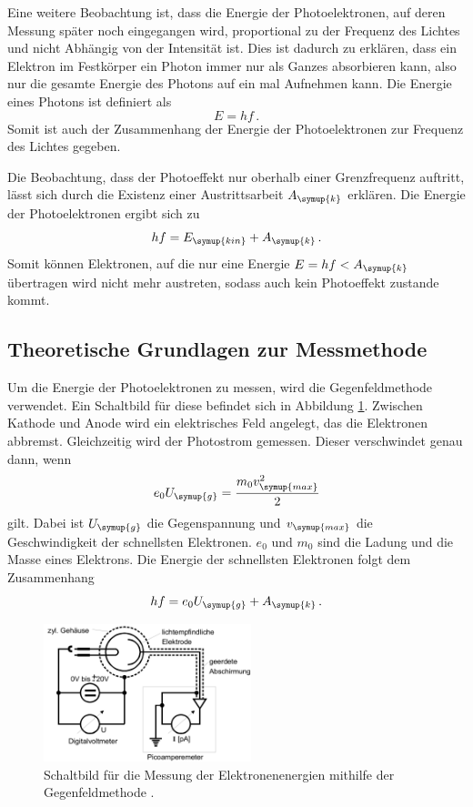 Eine weitere Beobachtung ist, dass die Energie der Photoelektronen, auf deren Messung später noch
eingegangen wird, proportional zu der Frequenz des Lichtes und nicht Abhängig von der
Intensität ist. Dies ist dadurch zu erklären, dass ein Elektron im Festkörper ein Photon
immer nur als Ganzes absorbieren kann, also nur die gesamte Energie des Photons auf ein mal
Aufnehmen kann. Die Energie eines Photons ist definiert als
\begin{equation}
  E=h f \,.
\end{equation}
Somit ist auch der Zusammenhang der Energie der Photoelektronen zur Frequenz des Lichtes gegeben.

Die Beobachtung, dass der Photoeffekt nur oberhalb einer Grenzfrequenz auftritt, lässt sich
durch die Existenz einer Austrittsarbeit $A_{\symup{k}}$ erklären. Die Energie der
Photoelektronen ergibt sich zu
\begin{equation}
  h f= E_{\symup{kin}}+A_{\symup{k}} \,.
\end{equation}
Somit können Elektronen, auf die nur eine Energie $E=hf<A_{\symup{k}}$ übertragen wird
nicht mehr austreten, sodass auch kein Photoeffekt zustande kommt.

\subsection{Theoretische Grundlagen zur Messmethode}
\label{subsec:Theorie_Messung}

Um die Energie der Photoelektronen zu messen, wird die Gegenfeldmethode verwendet. Ein
Schaltbild für diese befindet sich in Abbildung \ref{fig:schaltbild}. Zwischen
Kathode und Anode wird ein elektrisches Feld angelegt, das die Elektronen abbremst.
Gleichzeitig wird der Photostrom gemessen. Dieser verschwindet genau dann, wenn
\begin{equation}
  e_0 U_{\symup{g}}=\frac{m_0 v_{\symup{max}}^2}{2}
\end{equation}
gilt. Dabei ist $U_{\symup{g}}$ die Gegenspannung und $v_{\symup{max}}$ die
Geschwindigkeit der schnellsten Elektronen. $e_0$ und $m_0$ sind die Ladung und die
Masse eines Elektrons. Die Energie der schnellsten Elektronen folgt dem Zusammenhang
\begin{equation}
  h f=e_0 U_{\symup{g}} + A_{\symup{k}} \,.
\end{equation}

\begin{figure}
  \centering
  \includegraphics[height=4cm]{data/schaltbild.png}
  \caption{Schaltbild für die Messung der Elektronenenergien mithilfe der Gegenfeldmethode \cite{Versuchsanleitung}.}
  \label{fig:schaltbild}
\end{figure}

